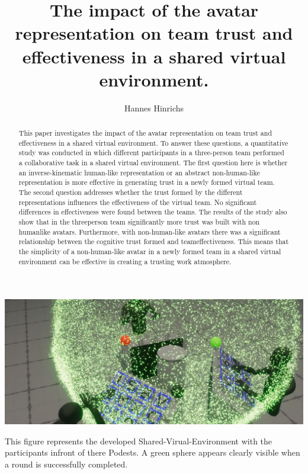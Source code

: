 \documentclass[sigchi]{acmart}
\begin{document}
\title{The impact of the avatar representation on team trust and effectiveness in a shared virtual environment.}

\author{Hannes Hinrichs}

\begin{abstract}
This paper investigates the impact of the avatar representation on team trust and effectiveness in a shared virtual environment. To answer these questions, a quantitative study was conducted in which different participants in a three-person team performed a collaborative task in a shared virtual environment. The first question here is whether an inverse-kinematic human-like representation or an abstract non-human-like representation is more effective in generating trust in a newly formed virtual team. The second question addresses whether the trust formed by the different representations influences the effectiveness of the virtual team. No significant differences in effectiveness were found between the teams. The results of the study also show that in the threeperson team significantly more trust was built with non humanlike avatars. Furthermore, with non-human-like avatars there was a significant relationship between the cognitive trust formed and teameffectiveness. This means that the simplicity of a non-human-like avatar in a newly formed team in a shared virtual environment can be effective in creating a trusting work atmosphere.
\end{abstract}


\begin{teaserfigure}
  \includegraphics[width=\textwidth]{Abbildungen/RoundSuccsessful2}
  \caption{This figure represents the developed Shared-Virual-Environment with the participants infront of there Podests. A green sphere appears clearly visible when a round is successfully completed.}
  \label{fig:teaser}
\end{teaserfigure}
\end{document}
